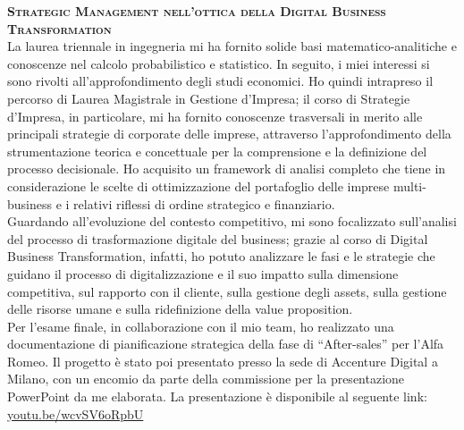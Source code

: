 


\textbf{\textsc{Strategic Management nell’ottica della Digital Business Transformation}} \\
La laurea triennale in ingegneria mi ha fornito solide basi matematico-analitiche e conoscenze nel calcolo probabilistico e statistico. In seguito, i miei interessi si sono rivolti all’approfondimento degli studi economici. Ho quindi intrapreso il percorso di Laurea Magistrale in Gestione d’Impresa; il corso di Strategie d’Impresa, in particolare, mi ha fornito conoscenze trasversali in merito alle principali strategie di corporate delle imprese, attraverso l’approfondimento della strumentazione teorica e concettuale per la comprensione e la definizione del processo decisionale. Ho acquisito un framework di analisi completo che tiene in considerazione le scelte di ottimizzazione del portafoglio delle imprese multi-business e i relativi riflessi di ordine strategico e finanziario. \\
Guardando all’evoluzione del contesto competitivo, mi sono focalizzato sull’analisi del processo di trasformazione digitale del business; grazie al corso di Digital Business Transformation, infatti, ho potuto analizzare le fasi e le strategie che guidano il processo di digitalizzazione e il suo impatto sulla dimensione competitiva, sul rapporto con il cliente, sulla gestione degli assets, sulla gestione delle risorse umane e sulla ridefinizione della value proposition. \\
Per l’esame finale, in collaborazione con il mio team, ho realizzato una documentazione di pianificazione strategica della fase di “After-sales” per l’Alfa Romeo. Il progetto è stato poi presentato presso la sede di Accenture Digital a Milano, con un encomio da parte della commissione per la presentazione PowerPoint da me elaborata.
La presentazione è disponibile al seguente link: \\
\href{https://youtu.be/wcvSV6oRpbU}{youtu.be/wcvSV6oRpbU}

